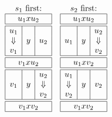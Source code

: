 \documentclass[../generics]{subfiles}
\begin{document}
\begin{ceqn}
\[
\begin{array}{cc}
\text{$s_1$ first:}&
\text{$s_2$ first:}\\
\begin{array}{|c|c|c|}
\hline
\multicolumn{3}{|c|}{u_1xu_2}\\
\hline
\hline
u_1&&\\
\Downarrow&y&u_2\\
v_1&&\\
\hline
\hline
\multicolumn{3}{|c|}{v_1xu_2}\\
\hline
\hline
&&u_2\\
v_1&y&\Downarrow\\
&&v_2\\
\hline
\hline
\multicolumn{3}{|c|}{v_1xv_2}\\
\hline
\end{array}
&
\begin{array}{|c|c|c|}
\hline
\multicolumn{3}{|c|}{u_1xu_2}\\
\hline
\hline
&&u_2\\
u_1&y&\Downarrow\\
&&v_2\\
\hline
\hline
\multicolumn{3}{|c|}{u_1xv_2}\\
\hline
\hline
u_1&&\\
\Downarrow&y&v_2\\
v_2&&\\
\hline
\hline
\multicolumn{3}{|c|}{v_1xv_2}\\
\hline
\end{array}
\end{array}
\]
\end{ceqn}
\end{document}
